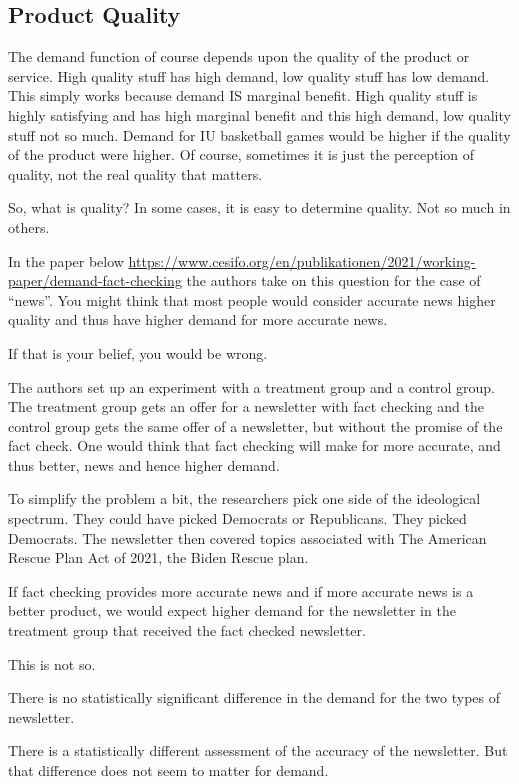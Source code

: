 \documentclass[
]{book}
\begin{document}
\hypertarget{product-quality}{%
\subsection{Product Quality}\label{product-quality}}

The demand function of course depends upon the quality of the product or service. High quality stuff has high demand, low quality stuff has low demand. This simply works because demand IS marginal benefit. High quality stuff is highly satisfying and has high marginal benefit and this high demand, low quality stuff not so much. Demand for IU basketball games would be higher if the quality of the product were higher. Of course, sometimes it is just the perception of quality, not the real quality that matters.

So, what is quality? In some cases, it is easy to determine quality. Not so much in others.

In the paper below
\url{https://www.cesifo.org/en/publikationen/2021/working-paper/demand-fact-checking}
the authors take on this question for the case of ``news''. You might think that most people would consider accurate news higher quality and thus have higher demand for more accurate news.

If that is your belief, you would be wrong.

The authors set up an experiment with a treatment group and a control group. The treatment group gets an offer for a newsletter with fact checking and the control group gets the same offer of a newsletter, but without the promise of the fact check. One would think that fact checking will make for more accurate, and thus better, news and hence higher demand.

To simplify the problem a bit, the researchers pick one side of the ideological spectrum. They could have picked Democrats or Republicans. They picked Democrats. The newsletter then covered topics associated with The American Rescue Plan Act of 2021, the Biden Rescue plan.

If fact checking provides more accurate news and if more accurate news is a better product, we would expect higher demand for the newsletter in the treatment group that received the fact checked newsletter.

This is not so.

There is no statistically significant difference in the demand for the two types of newsletter.

There is a statistically different assessment of the accuracy of the newsletter. But that difference does not seem to matter for demand.
\end{document}
